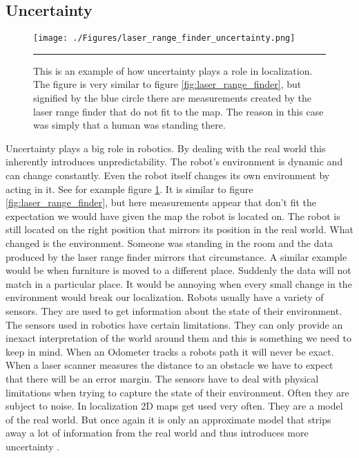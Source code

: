 \subsection{Uncertainty}
\begin{figure}[htbp]
	\centering
		\texttt{[image: ./Figures/laser\_range\_finder\_uncertainty.png]}
		\rule{35em}{0.5pt}
	\caption[Example of uncertainty when localizing with a laser range finder]{This is an example of how uncertainty plays a role in localization. The figure is very similar to figure \ref{fig:laser_range_finder}, but signified by the blue circle there are measurements created by the laser range finder that do not fit to the map. The reason in this case was simply that a human was standing there.}
	\label{fig:laser_range_finder_uncertainty}
\end{figure}
Uncertainty plays a big role in robotics. By dealing with the real world this inherently introduces unpredictability. The robot's environment is dynamic and can change constantly. Even the robot itself changes its own environment by acting in it. See for example figure \ref{fig:laser_range_finder_uncertainty}. It is similar to figure \ref{fig:laser_range_finder}, but here measurements appear that don't fit the expectation we would have given the map the robot is located on. The robot is still located on the right position that mirrors its position in the real world. What changed is the environment. Someone was standing in the room and the data produced by the laser range finder mirrors that circumstance. A similar example would be when furniture is moved to a different place. Suddenly the data will not match in a particular place. It would be annoying when every small change in the environment would break our localization. 
Robots usually have a variety of sensors. They are used to get information about the state of their environment. The sensors used in robotics have certain limitations. They can only provide an inexact interpretation of the world around them and this is something we need to keep in mind. When an \gls{Odometer} tracks a robots path it will never be exact. When a laser scanner measures the distance to an obstacle we have to expect that there will be an error margin. The sensors have to deal with physical limitations when trying to capture the state of their environment. Often they are subject to noise. In localization 2D maps get used very often. They are a model of the real world. But once again it is only an approximate model that strips away a lot of information from the real world and thus introduces more uncertainty \citep[p.\ 3-4]{Thrun:2005:PR:1121596}.

